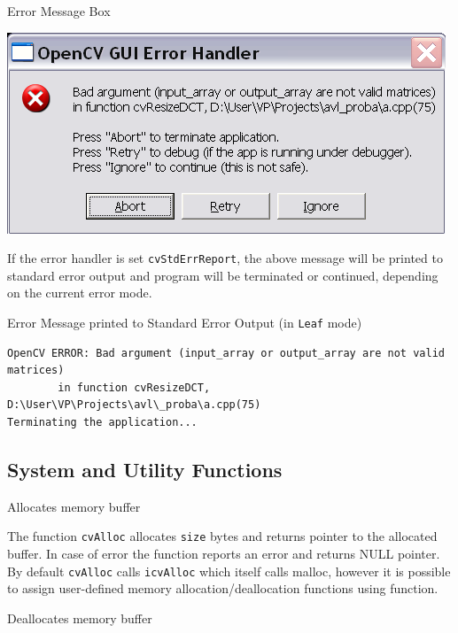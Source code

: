 Error Message Box

\includegraphics[width=0.5 \textwidth]{pics/errmsg.png}

If the error handler is set \texttt{cvStdErrReport}, the above message will be printed to standard error output and program will be terminated or continued, depending on the current error mode.

Error Message printed to Standard Error Output (in \texttt{Leaf} mode)

\begin{verbatim}
OpenCV ERROR: Bad argument (input_array or output_array are not valid matrices)
        in function cvResizeDCT, D:\User\VP\Projects\avl\_proba\a.cpp(75)
Terminating the application...
\end{verbatim}

\subsection{System and Utility Functions}

\label{Alloc}

Allocates memory buffer


\begin{description}
\end{description}

The function \texttt{cvAlloc} allocates \texttt{size} bytes and returns
pointer to the allocated buffer. In case of error the function reports an
error and returns NULL pointer. By default \texttt{cvAlloc} calls
\texttt{icvAlloc} which
itself calls malloc, however it is possible to assign user-defined memory
allocation/deallocation functions using  function.

\label{Free}

Deallocates memory buffer


\begin{description}
\end{description}

